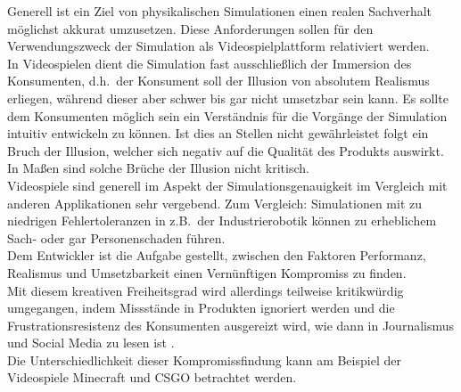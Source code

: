 \label{sec:physical_realism}
Generell ist ein Ziel von physikalischen Simulationen einen realen Sachverhalt möglichst akkurat umzusetzen. Diese Anforderungen sollen für den Verwendungszweck der Simulation als Videospielplattform relativiert werden.\\
In Videospielen dient die Simulation fast ausschließlich der Immersion des Konsumenten, d.h.~der Konsument soll der Illusion von absolutem Realismus erliegen, während dieser aber schwer bis gar nicht umsetzbar sein kann. Es sollte dem Konsumenten möglich sein ein Verständnis für die Vorgänge der Simulation intuitiv entwickeln zu können. Ist dies an Stellen nicht gewährleistet folgt ein Bruch der Illusion, welcher sich negativ auf die Qualität des Produkts auswirkt. In Maßen sind solche Brüche der Illusion nicht kritisch.\\
Videospiele sind generell im Aspekt der Simulationsgenauigkeit im Vergleich mit anderen Applikationen sehr vergebend. Zum Vergleich: Simulationen mit zu niedrigen Fehlertoleranzen in z.B.~der Industrierobotik können zu erheblichem Sach- oder gar Personenschaden führen.\\
Dem Entwickler ist die Aufgabe gestellt, zwischen den Faktoren Performanz, Realismus und Umsetzbarkeit einen Vernünftigen Kompromiss zu finden.\\
Mit diesem kreativen Freiheitsgrad wird allerdings teilweise kritikwürdig umgegangen, indem Missstände in Produkten ignoriert werden und die Frustrationsresistenz des Konsumenten ausgereizt wird, wie dann in Journalismus und Social Media zu lesen ist \cites{unfinished_games0}{unfinished_games1}{unfinished_games2}.\\
Die Unterschiedlichkeit dieser Kompromissfindung kann am Beispiel der Videospiele Minecraft und CSGO betrachtet werden.
